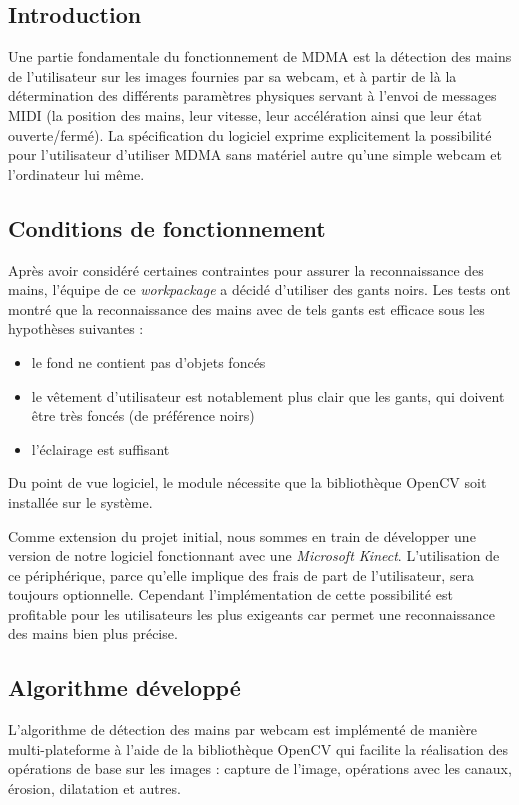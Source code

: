\subsection*{Introduction}
\par Une partie fondamentale du fonctionnement de MDMA est la détection des mains de l'utilisateur sur les images fournies par sa webcam, et à partir de là la détermination des différents paramètres physiques servant à l'envoi de messages MIDI (la position des mains, leur vitesse, leur accélération ainsi que leur état ouverte/fermé). La spécification du logiciel exprime explicitement la possibilité pour l'utilisateur d'utiliser MDMA sans matériel autre qu'une simple webcam et l'ordinateur lui même.
\subsection*{Conditions de fonctionnement}
\par Après avoir considéré certaines contraintes pour assurer la reconnaissance des mains, l'équipe de ce \emph{workpackage} a décidé d'utiliser des gants noirs. Les tests ont montré que la reconnaissance des mains avec de tels gants est efficace sous les hypothèses suivantes :
\begin{itemize}
    \item le fond ne contient pas d'objets foncés
    \item le vêtement d'utilisateur est notablement plus clair que les gants, qui doivent être très foncés (de préférence noirs)
    \item l'éclairage est suffisant
\end{itemize}
\par Du point de vue logiciel, le module nécessite que la bibliothèque OpenCV soit installée sur le système.
\par Comme extension du projet initial, nous sommes en train de développer une version de notre logiciel fonctionnant avec une \emph{Microsoft Kinect}. L'utilisation de ce périphérique, parce qu'elle implique des frais de part de l'utilisateur, sera toujours optionnelle. Cependant l'implémentation de cette possibilité est profitable pour les utilisateurs les plus exigeants car permet une reconnaissance des mains bien plus précise.
\subsection*{Algorithme développé}
\par L'algorithme de détection des mains par webcam est implémenté de manière multi-plateforme à l'aide de la bibliothèque OpenCV qui facilite la réalisation des opérations de base sur les images : capture de l'image, opérations avec les canaux, érosion, dilatation et autres.
